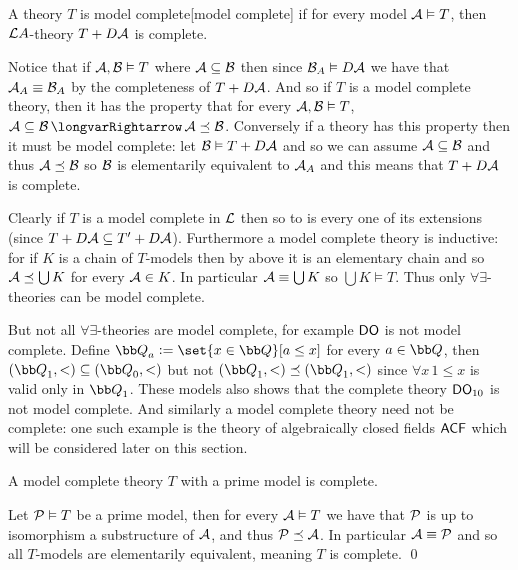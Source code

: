 \bdefn

    A theory $T$ is {\emphcolor model complete}[model complete] if for every model ${\cal A}\vDash T$, then ${\cal L}A$-theory $T+D{\cal A}$ is complete.

\edefn

Notice that if ${\cal A},{\cal B}\vDash T$ where ${\cal A}\subseteq{\cal B}$ then since ${\cal B}_A\vDash D{\cal A}$ we have that ${\cal A}_A\equiv{\cal B}_A$ by the completeness of $T+D{\cal A}$.
And so if $T$ is a model complete theory, then it has the property that for every ${\cal A},{\cal B}\vDash T$, ${\cal A}\subseteq{\cal B}\implies{\cal A}\preceq{\cal B}$.
Conversely if a theory has this property then it must be model complete: let ${\cal B}\vDash T+D{\cal A}$ and so we can assume ${\cal A}\subseteq{\cal B}$ and thus ${\cal A}\preceq{\cal B}$ so
${\cal B}$ is elementarily equivalent to ${\cal A}_A$ and this means that $T+D{\cal A}$ is complete.

Clearly if $T$ is a model complete in ${\cal L}$ then so to is every one of its extensions (since $T+D{\cal A}\subseteq T'+D{\cal A}$).
Furthermore a model complete theory is inductive: for if $K$ is a chain of $T$-models then by above it is an elementary chain and so ${\cal A}\preceq\bigcup K$ for every ${\cal A}\in K$.
In particular ${\cal A}\equiv\bigcup K$ so $\bigcup K\vDash T$.
Thus only $\forall\exists$-theories can be model complete.

But not all $\forall\exists$-theories are model complete, for example ${\sf DO}$ is not model complete.
Define ${\bb Q}_a\coloneqq\set{x\in{\bb Q}}[a\leq x]$ for every $a\in{\bb Q}$, then $({\bb Q}_1,<)\subseteq({\bb Q}_0,<)$ but not $({\bb Q}_1,<)\preceq({\bb Q}_1,<)$ since $\forall x\,1\leq x$ is valid only
in ${\bb Q}_1$.
These models also shows that the complete theory ${\sf DO}_{10}$ is not model complete.
And similarly a model complete theory need not be complete: one such example is the theory of algebraically closed fields ${\sf ACF}$ which will be considered later on this section.

\bthrm[name=modelcompleteprime]

    A model complete theory $T$ with a prime model is complete.

\ethrm

Let ${\cal P}\vDash T$ be a prime model, then for every ${\cal A}\vDash T$ we have that ${\cal P}$ is up to isomorphism a substructure of ${\cal A}$, and thus ${\cal P}\preceq{\cal A}$.
In particular ${\cal A}\equiv{\cal P}$ and so all $T$-models are elementarily equivalent, meaning $T$ is complete.
\qed

